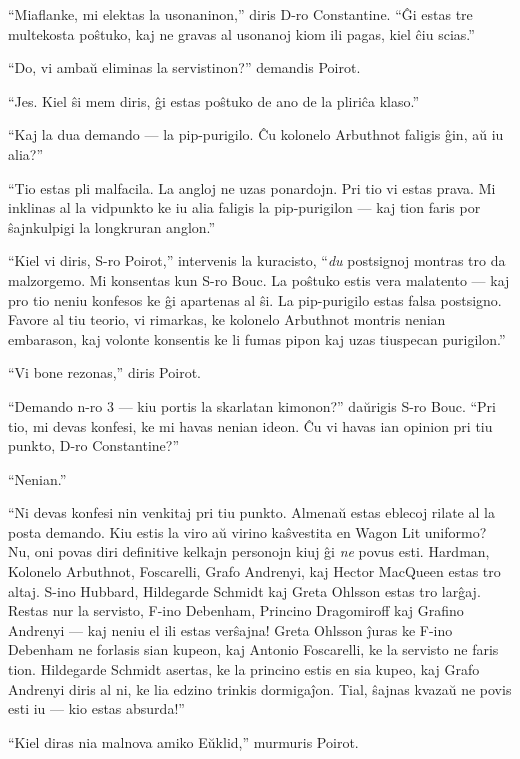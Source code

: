 ``Miaflanke, mi elektas la usonaninon,'' diris D-ro Constantine. ``Ĝi estas tre multekosta poŝtuko, kaj ne gravas al usonanoj kiom ili pagas, kiel ĉiu scias.''

``Do, vi ambaŭ eliminas la servistinon?'' demandis Poirot.

``Jes. Kiel ŝi mem diris, ĝi estas poŝtuko de ano de la pliriĉa klaso.''

``Kaj la dua demando --- la pip-purigilo. Ĉu kolonelo Arbuthnot faligis ĝin, aŭ iu alia?''

``Tio estas pli malfacila. La angloj ne uzas ponardojn. Pri tio vi estas prava. Mi inklinas al la vidpunkto ke iu alia faligis la pip-purigilon --- kaj tion faris por ŝajnkulpigi la longkruran anglon.''

``Kiel vi diris, S-ro Poirot,'' intervenis la kuracisto, ``\emph{du} postsignoj montras tro da malzorgemo. Mi konsentas kun S-ro Bouc. La poŝtuko estis vera malatento --- kaj pro tio neniu konfesos ke ĝi apartenas al ŝi. La pip-purigilo estas falsa postsigno. Favore al tiu teorio, vi rimarkas, ke kolonelo Arbuthnot montris nenian embarason, kaj volonte konsentis ke li fumas pipon kaj uzas tiuspecan purigilon.''

``Vi bone rezonas,'' diris Poirot.

``Demando n-ro 3 --- kiu portis la skarlatan kimonon?'' daŭrigis S-ro Bouc. ``Pri tio, mi devas konfesi, ke mi havas nenian ideon. Ĉu vi havas ian opinion pri tiu punkto, D-ro Constantine?''

``Nenian.''

``Ni devas konfesi nin venkitaj pri tiu punkto. Almenaŭ estas eblecoj rilate al la posta demando. Kiu estis la viro aŭ virino kaŝvestita en Wagon Lit uniformo? Nu, oni povas diri definitive kelkajn personojn kiuj ĝi \emph{ne} povus esti. Hardman, Kolonelo Arbuthnot, Foscarelli, Grafo Andrenyi, kaj Hector MacQueen estas tro altaj. S-ino Hubbard, Hildegarde Schmidt kaj Greta Ohlsson estas tro larĝaj. Restas nur la servisto, F-ino Debenham, Princino Dragomiroff kaj Grafino Andrenyi --- kaj neniu el ili estas verŝajna! Greta Ohlsson ĵuras ke F-ino Debenham ne forlasis sian kupeon, kaj Antonio Foscarelli, ke la servisto ne faris tion. Hildegarde Schmidt asertas, ke la princino estis en sia kupeo, kaj Grafo Andrenyi diris al ni, ke lia edzino trinkis dormigaĵon. Tial, ŝajnas kvazaŭ ne povis esti iu --- kio estas absurda!''

``Kiel diras nia malnova amiko Eŭklid,'' murmuris Poirot.

